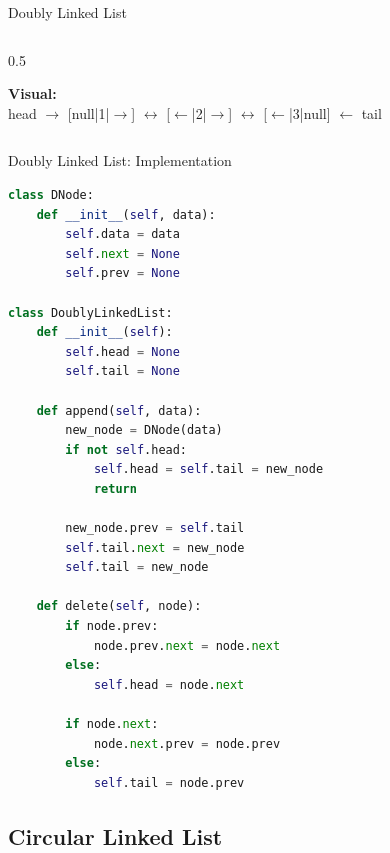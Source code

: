 \documentclass[aspectratio=169,xcolor=dvipsnames]{beamer}
\begin{document}
\begin{frame}{Doubly Linked List}
\begin{columns}
\begin{column}{0.5\textwidth}
\begin{center}
      \end{center}

      \vspace{0.5cm}
      \textbf{Visual:} \\
      head $\to$ [null|1|$\to$] $\leftrightarrow$ [$\leftarrow$|2|$\to$] $\leftrightarrow$ [$\leftarrow$|3|null] $\leftarrow$ tail
    \end{column}
  \end{columns}
\end{frame}

\begin{frame}[fragile]{Doubly Linked List: Implementation}
\begin{lstlisting}[language=Python, basicstyle=\tiny\ttfamily]
class DNode:
    def __init__(self, data):
        self.data = data
        self.next = None
        self.prev = None

class DoublyLinkedList:
    def __init__(self):
        self.head = None
        self.tail = None

    def append(self, data):
        new_node = DNode(data)
        if not self.head:
            self.head = self.tail = new_node
            return

        new_node.prev = self.tail
        self.tail.next = new_node
        self.tail = new_node

    def delete(self, node):
        if node.prev:
            node.prev.next = node.next
        else:
            self.head = node.next

        if node.next:
            node.next.prev = node.prev
        else:
            self.tail = node.prev
\end{lstlisting}
\end{frame}

\subsection{Circular Linked List}
\end{document}
